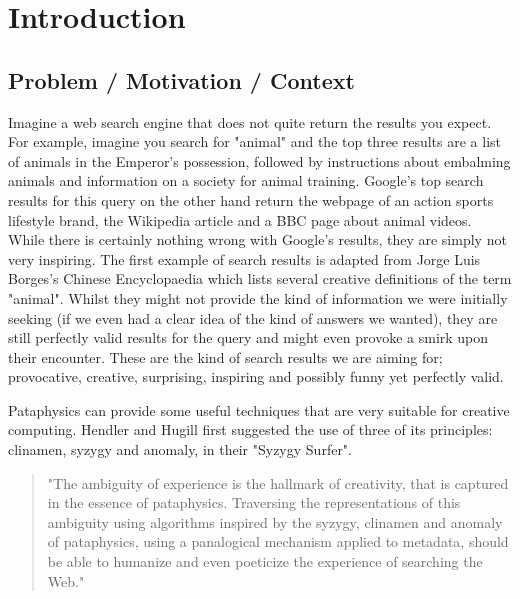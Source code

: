 
\chapter{Introduction}

\section{Problem / Motivation / Context}

Imagine a web search engine that does not quite return the results you expect. For example, imagine you search for "animal" and the top three results are a list of animals in the Emperor's possession, followed by instructions about embalming animals and information on a society for animal training. Google's top search results for this query on the other hand return the webpage of an action sports lifestyle brand, the Wikipedia article and a BBC page about animal videos. While there is certainly nothing wrong with Google's results, they are simply not very inspiring. The first example of search results is adapted from Jorge Luis Borges's Chinese Encyclopaedia \citep{Borges2000} which lists several creative definitions of the term "animal". Whilst they might not provide the kind of information we were initially seeking (if we even had a clear idea of the kind of answers we wanted), they are still perfectly valid results for the query and might even provoke a smirk upon their encounter. These are the kind of search results we are aiming for; provocative, creative, surprising, inspiring and possibly funny yet perfectly valid.

Pataphysics can provide some useful techniques that are very suitable for creative computing. Hendler and Hugill first suggested the use of three of its principles: clinamen, syzygy and anomaly, in their "Syzygy Surfer".

\begin{quote}
  "The ambiguity of experience is the hallmark of creativity, that is captured in the essence of pataphysics. Traversing the representations of this ambiguity using algorithms inspired by the syzygy, clinamen and anomaly of pataphysics, using a panalogical mechanism applied to metadata, should be able to humanize and even poeticize the experience of searching the Web." \citep{Hendler2013}
\end{quote}

